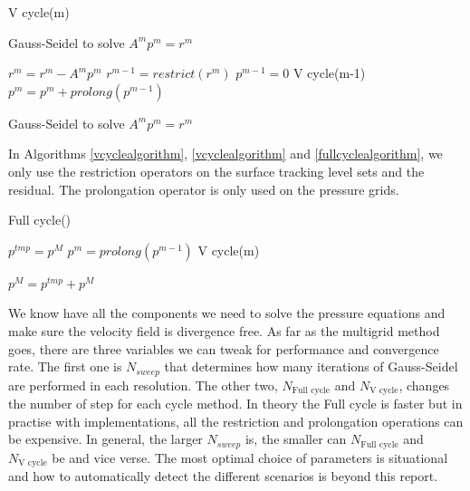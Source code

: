 \begin{algorithm}
\caption{V cycle(m)}
\begin{algorithmic}[1]

\STATE Gauss-Seidel to solve $A^mp^m = r^m$
\ENDFOR

\STATE $r^m = r^m - A^mp^m$
\STATE $r^{m-1} = restrict(r^m)$
\STATE $p^{m-1} = 0$
\STATE V cycle(m-1)
\STATE $p^m = p^m + prolong(p^{m-1})$

\STATE Gauss-Seidel to solve $A^mp^m = r^m$
\ENDFOR

\end{algorithmic}
\label{multigridalgorithm}
\end{algorithm}

In Algorithms \ref{vcyclealgorithm}, \ref{vcyclealgorithm} and \ref{fullcyclealgorithm}, we only use the restriction operators on the surface tracking level sets and the residual. The prolongation operator is only used on the pressure grids. 

\begin{algorithm}
\caption{Full cycle()}
\begin{algorithmic}[1]

\STATE $p^{tmp} = p^M$
\STATE $p^m = prolong(p^{m-1})$
\ENDIF
\STATE V cycle(m)

\ENDFOR

\STATE $p^M = p^{tmp} + p^M$

\end{algorithmic}
\label{fullcyclealgorithm}
\end{algorithm}

We know have all the components we need to solve the pressure equations and make sure the velocity field is divergence free. As far as the multigrid method goes, there are three variables we can tweak for performance and convergence rate. The first one is $N_{sweep}$ that determines how many iterations of Gauss-Seidel are performed in each resolution. The other two, $N_{\text{Full cycle}}$ and $N_\text{V cycle}$, changes the number of step for each cycle method. In theory the Full cycle is faster but in practise with implementations, all the restriction and prolongation operations can be expensive. In general, the larger $N_{sweep}$ is, the smaller can $N_{\text{Full cycle}}$ and $N_\text{V cycle}$ be and vice verse. The most optimal choice of parameters is situational and how to automatically detect the different scenarios is beyond this report. 
